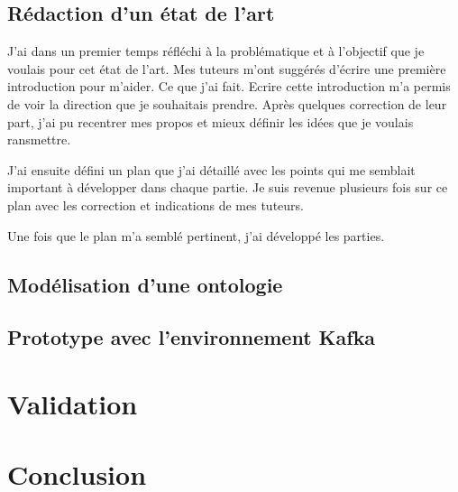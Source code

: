 \documentclass{article}
\begin{document}
	\subsection{Rédaction d'un état de l'art}
		J'ai dans un premier temps réfléchi à la problématique et à l'objectif que je voulais pour cet état de l'art. Mes tuteurs m'ont suggérés d'écrire une première introduction pour m'aider. Ce que j'ai fait.
		Ecrire cette introduction m'a permis de voir la direction que je souhaitais prendre.
		Après quelques correction de leur part, j'ai pu recentrer mes propos et mieux définir les idées que je voulais ransmettre.\par
		J'ai ensuite défini un plan que j'ai détaillé avec les points qui me semblait important à développer dans chaque partie. Je suis revenue plusieurs fois sur ce plan avec les correction et indications de mes tuteurs.\par
		Une fois que le plan m'a semblé pertinent, j'ai développé les parties.
	\subsection{Modélisation d'une ontologie}
	\subsection{Prototype avec l'environnement Kafka}

\section{Validation}

\section{Conclusion}


\newpage
\appendix
\end{document}
